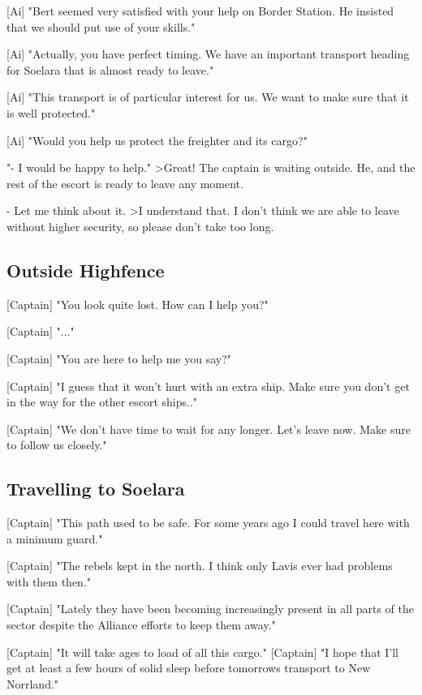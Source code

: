 \documentclass[a4paper,12pt]{article}
\begin{document}
[Ai] "Bert seemed very satisfied with your help on Border Station. He insisted
that we should put use of your skills."

[Ai] "Actually, you have perfect timing. We have an important transport heading
for Soelara that is almost ready to leave."

[Ai] "This transport is of particular interest for us. We want to make sure that it is well protected."

[Ai] "Would you help us protect the freighter and its cargo?"

"- I would be happy to help."
\textgreater Great! The captain is waiting outside. He, and the rest of the escort
is ready to leave any moment.

- Let me think about it.
\textgreater I understand that. I don't think we are able to leave without higher
security, so please don't take too long.

\subsection{Outside Highfence}

[Captain] "You look quite lost. How can I help you?"

[Captain] "..."

[Captain] "You are here to help me you say?" 

[Captain] "I guess that it won't hurt with an extra ship. Make sure you don't get in the way for the other
escort ships.."

[Captain] "We don't have time to wait for any longer. Let's leave now. Make sure to follow
us closely."

\subsection{Travelling to Soelara}

[Captain] "This path used to be safe. For some years ago I could travel here with a
minimum guard."

[Captain] "The rebels kept in the north. I think only Lavis ever had problems with them then."

[Captain] "Lately they have been becoming increasingly present in all parts of the sector
despite the Alliance efforts to keep them away."

[Captain] "It will take ages to load of all this cargo." 
[Captain] "I hope that I'll get at least a few hours of solid sleep before tomorrows 
transport to New Norrland."
\end{document}
